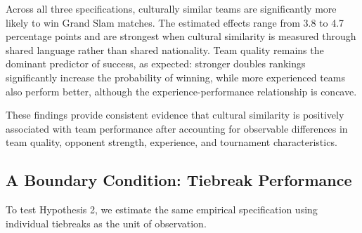 \documentclass[10pt]{article}
\begin{document}
Across all three specifications, culturally similar teams are significantly more likely to win Grand Slam matches. The estimated effects range from 3.8 to 4.7 percentage points and are strongest when cultural similarity is measured through shared language rather than shared nationality. Team quality remains the dominant predictor of success, as expected: stronger doubles rankings significantly increase the probability of winning, while more experienced teams also perform better, although the experience-performance relationship is concave.

These findings provide consistent evidence that cultural similarity is positively associated with team performance after accounting for observable differences in team quality, opponent strength, experience, and tournament characteristics.

\subsection{A Boundary Condition: Tiebreak Performance} 



To test Hypothesis 2, we estimate the same empirical specification using individual tiebreaks as the unit of observation.
\end{document}
